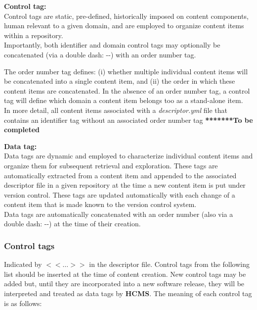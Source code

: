 \documentclass[12pt]{article}
\begin{document}
\begin{description}
\item {\bf Control tag:}\\
Control tags are static, pre-defined, historically imposed on content components, human relevant to a given domain, and are employed to organize content items within a repository.\\
Importantly, both identifier and domain control tags may optionally be concatenated (via a double dash: -{}-) with an order number tag. 

The order number tag defines: (i) whether multiple individual content items will be concatenated into a single content item, and (ii) the order in which these content items are concatenated. In the absence of an order number tag, a control tag will define which domain a content item belongs too as a stand-alone item.\\
In more detail, all content items associated with a {\it descriptor.yml} file that contains an identifier tag without an associated order number tag {\bf ********To be completed}
\item {\bf Data tag:}\\
Data tags are dynamic and employed to characterize individual content items and organize them for subsequent retrieval and exploration. These tags are automatically extracted from a content item and appended to the associated descriptor file in a given repository at the time a new content item is put under version control. These tags are updated automatically with each change of a content item that is made known to the version control system.\\
Data tags are automatically concatenated with an order number (also via a double dash: -{}-) at the time of their creation.
\end{description}

\subsubsection{Control tags}

Indicated by {\small $<<\ldots>>$} in the descriptor file. Control tags from the following list should be inserted at the time of content creation. New control tags may be added but, until they are incorporated into a new software release, they will be interpreted and treated as data tags by {\bf \small HCMS}. The meaning of each control tag is as follows:
\end{document}
